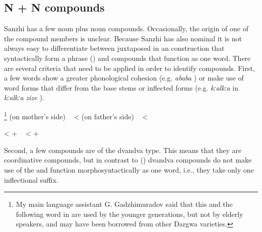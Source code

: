
\subsection{N + N compounds}
\label{ssec:Nounnoun compounds}

Sanzhi has a few noun plus noun compounds. Occasionally, the origin of one of the compound members is unclear. Because Sanzhi has also nominal  it is not always easy to differentiate between juxtaposed  in an  construction that syntactically form a phrase () and compounds that function as one word. There are several criteria that need to be applied in order to identify compounds. First, a few words show a greater phonological cohesion (e.g. \textit{ababa} ) or make use of word forms that differ from the base stems or inflected forms (e.g. \textit{kːalkːa} in \textit{kːalkːa zize} ).
%
\begin{exe}
	\ex	\label{ex:kːalkːa zizeraspberry}
	\begin{xlist}
		\TabPositions{10em,12em}
		\ex	{}\footnote{My main language assistant G. Gadzhimuradov said that this and the following word in  are used by the younger generations, but not by elderly speakers, and may have been borrowed from other Dargwa varieties.}  (on mother's side)
		\sn	~\hspace*{1em}					\tab	<	\tab	{} 
				\ex	\label{ex:ATTABAphon}   (on father's side)
		\sn	~\hspace*{1em}	\tab	<	\tab	{} 
		
		\newpage
		
		\ex	{} 			\tab	<	\tab	{}  +  
		\ex	{} 
		\sn	~\hspace*{1em}					\tab	<	\tab	{}  +  
	\end{xlist}
\end{exe}

Second, a few compounds are of the dvandva type. This means that they are coordinative compounds, but in contrast to   () dvandva compounds do not make use of the  and function morphosyntactically as one word, i.e., they take only one inflectional suffix.

